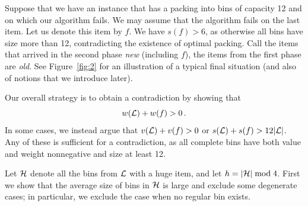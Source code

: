 Suppose that we have an instance that has a packing into bins of
capacity 12 and on which our algorithm fails. We may assume that the
algorithm fails on the last item. Let us denote this item by $f$.
We have $s(f)>6$, as otherwise all bins have size more than 12,
contradicting the existence of optimal packing.
Call the items that arrived in the second phase {\em new} (including
$f$), the items from the first phase are {\em old}.
See Figure~\ref{fig:2} for an illustration of a typical final
situation (and also of notions that we introduce later).

Our overall strategy is to obtain a contradiction by showing that  
$$w({\mathcal L})+w(f)>0\,.$$ 
In some cases, we instead argue that
$v({\mathcal L})+v(f)>0$ or $s({\mathcal L})+s(f)>12|{\mathcal L}|$. Any of these is
sufficient for a contradiction, as all complete bins have both
value and weight nonnegative and size at least 12.

Let ${\mathcal H}$ denote all the bins from ${\mathcal L}$ with a huge item,
and let ${h}=|{\mathcal H}| \bmod 4$. First
we show that the average size of bins in ${\mathcal H}$ is large and exclude
some degenerate cases; in particular, we exclude the case when no
regular bin exists.

